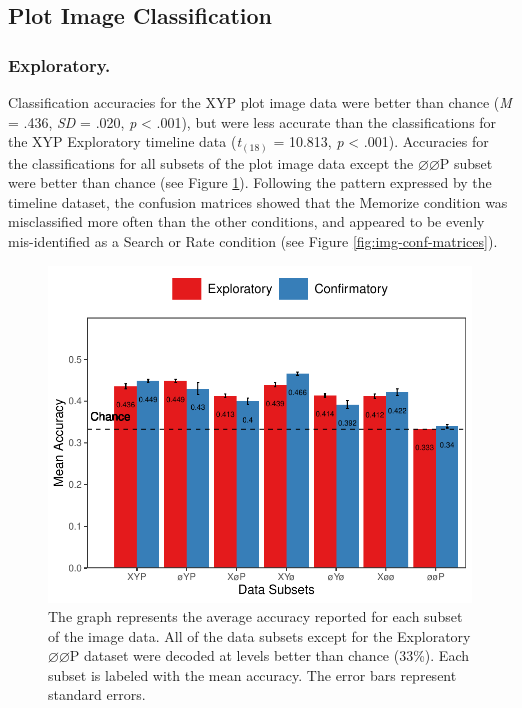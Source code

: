 \documentclass[
  english,
  man,floatsintext]{apa6}
\begin{document}
\subsection{Plot Image Classification}
\subsubsection{Exploratory.}

Classification accuracies for the XYP plot image data were better than chance (\emph{M} = .436, \emph{SD} = .020, \emph{p} \textless{} .001), but were less accurate than the classifications for the XYP Exploratory timeline data (\emph{t}\(_{(18)}\) = 10.813, \emph{p} \textless{} .001). Accuracies for the classifications for all subsets of the plot image data except the \(\varnothing\varnothing\)P subset were better than chance (see Figure \ref{fig:img-parcellation-chance}). Following the pattern expressed by the timeline dataset, the confusion matrices showed that the Memorize condition was misclassified more often than the other conditions, and appeared to be evenly mis-identified as a Search or Rate condition (see Figure \ref{fig:img-conf-matrices}).

\begin{figure}
\centering
\includegraphics{results/r_code/img_subset_chance.pdf}
\caption{\label{fig:img-parcellation-chance}The graph represents the average accuracy reported for each subset of the image data. All of the data subsets except for the Exploratory \(\varnothing\varnothing\)P dataset were decoded at levels better than chance (33\%). Each subset is labeled with the mean accuracy. The error bars represent standard errors.}
\end{figure}
\end{document}
